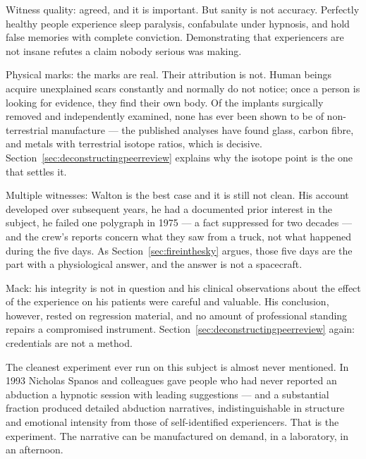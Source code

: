 Witness quality: agreed, and it is important. But sanity is not accuracy. Perfectly healthy
people experience sleep paralysis, confabulate under hypnosis, and hold false memories with
complete conviction. Demonstrating that experiencers are not insane refutes a claim nobody
serious was making.

Physical marks: the marks are real. Their attribution is not. Human beings acquire
unexplained scars constantly and normally do not notice; once a person is looking for evidence,
they find their own body. Of the implants surgically removed and independently examined, none
has ever been shown to be of non-terrestrial manufacture --- the published analyses have found
glass, carbon fibre, and metals with terrestrial isotope ratios, which is decisive.
Section~\ref{sec:deconstructingpeerreview} explains why the isotope point is the one that settles it.

Multiple witnesses: Walton is the best case and it is still not clean. His account developed
over subsequent years, he had a documented prior interest in the subject, he failed one
polygraph in 1975 --- a fact suppressed for two decades --- and the crew's reports concern
what they saw from a truck, not what happened during the five days. As
Section~\ref{sec:fireinthesky} argues, those five days are the part with a physiological answer,
and the answer is not a spacecraft.

Mack: his integrity is not in question and his clinical observations about the effect of the
experience on his patients were careful and valuable. His conclusion, however, rested on
regression material, and no amount of professional standing repairs a compromised instrument.
Section~\ref{sec:deconstructingpeerreview} again: credentials are not a method.

\begin{funfact}
The cleanest experiment ever run on this subject is almost never mentioned. In 1993 Nicholas
Spanos and colleagues gave people who had never reported an abduction a hypnotic session with
leading suggestions --- and a substantial fraction produced detailed abduction narratives,
indistinguishable in structure and emotional intensity from those of self-identified
experiencers. That is the experiment. The narrative can be manufactured on demand, in a
laboratory, in an afternoon.
\end{funfact}

